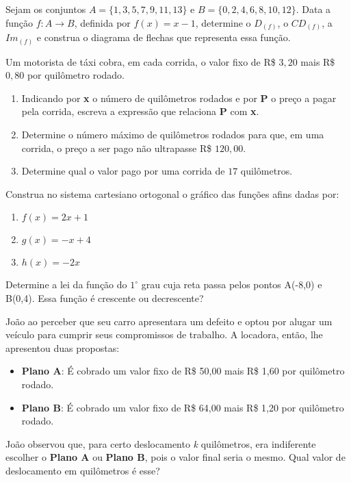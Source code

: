 \documentclass{ufcdocument}
\begin{document}
    \begin{question}
        \item Sejam os conjuntos $A=\{1,3,5,7,9,11,13\}$ e $B=\{0,2,4,6,8,10,12\}$. Data a função $f:A \rightarrow B$, definida por $f(x) = x - 1$, determine o $D_{(f)}$, o $CD_{(f)}$, a $Im_{(f)}$ e construa o diagrama de flechas que representa essa função. 

        \item Um motorista de táxi cobra, em cada corrida, o valor fixo de R\$ $3,20$ mais R\$ $0,80$ por quilômetro rodado.
        \begin{enumerate}[label=\alph*)]
        	\item Indicando por \textbf{x} o número de quilômetros rodados e por \textbf{P} o preço a pagar pela corrida, escreva a expressão que relaciona \textbf{P} com \textbf{x}.  
        	\item Determine o número máximo de quilômetros rodados para que, em uma corrida, o preço a ser pago não ultrapasse R\$ $120,00$. 
        	\item Determine qual o valor pago por uma corrida de $17$ quilômetros. 
        \end{enumerate}
    	\item Construa no sistema cartesiano ortogonal o gráfico das funções afins dadas por:
    	\begin{enumerate}[label=\alph*)]
    		\item $f(x) = 2x + 1$ 
    		\item $g(x) = -x + 4$ 
    		\item $h(x) = -2x$ 
    	\end{enumerate}
    	\item Determine a lei da função do $1^\circ$ grau cuja reta passa pelos pontos A(-8,0) e B(0,4). Essa função é crescente ou decrescente? 
    	\item João ao perceber que seu carro apresentara um defeito e optou por alugar um veículo para cumprir seus compromissos de trabalho. A locadora, então, lhe apresentou duas propostas:
    	\begin{itemize}
    		\item \textbf{Plano A}: É cobrado um valor fixo de R\$ 50,00 mais R\$ 1,60 por quilômetro rodado.
    		\item \textbf{Plano B}: É cobrado um valor fixo de R\$ 64,00 mais R\$ 1,20 por quilômetro rodado. 
    	\end{itemize}
    	João observou que, para certo deslocamento \textit{k} quilômetros, era indiferente escolher o \textbf{Plano A} ou \textbf{Plano B}, pois o valor final seria o mesmo. Qual valor de deslocamento em quilômetros é esse? 
    \end{question}
\end{document}
